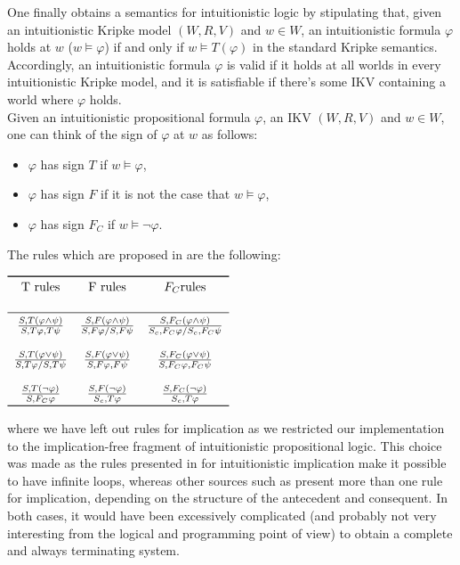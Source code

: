 One finally obtains a semantics for intuitionistic logic by stipulating that, given an intuitionistic Kripke model $(W,R,V)$ and $w \in W$, an intuitionistic formula $\varphi$ holds at $w$ ($w \vDash \varphi$) if and only if $w \vDash T(\varphi)$ in the standard Kripke semantics.
Accordingly, an intuitionistic formula $\varphi$ is valid if it holds at all worlds in every intuitionistic Kripke model, and it is satisfiable if there's some IKV containing a world where $\varphi$ holds. \\
Given an intuitionistic propositional formula $\varphi$, an IKV $(W,R,V)$ and $w \in W$, one can think of the sign of $\varphi$ at $w$ as follows:
\begin{itemize}
    \item $\varphi$ has sign $T$ if $w \vDash \varphi$,
    \item $\varphi$ has sign $F$ if it is not the case that $w \vDash \varphi$,
    \item $\varphi$ has sign $F_C$ if $w \vDash \neg \varphi$.
\end{itemize}

The rules which are proposed in \cite{miglioli1994improved} are the following:

\begin{table}[h]
\Large
\centering
$\begin{array}{ ccc }
\toprule
\text{T rules} & \text{F rules} & F_C \text{rules} \\
& & \\
\midrule
\frac{S, T(\varphi \wedge \psi)}{S,T\varphi,T\psi}& \frac{S, F(\varphi \wedge \psi)}{S,F\varphi/S,F\psi} & \frac{S,F_C(\varphi \wedge \psi)}{S_c,F_C\varphi/S_c,F_C\psi}\\ 
& & \\
\frac{S, T(\varphi \vee \psi)}{S,T\varphi/S,T\psi} & \frac{S, F(\varphi \vee \psi)}{S,F\varphi,F\psi} & \frac{S,F_C(\varphi \vee \psi)}{S,F_C\varphi,F_C\psi}\\
& & \\
\frac{S, T(\neg \varphi)}{S,F_C\varphi} & \frac{S, F(\neg \varphi)}{S_c,T\varphi} & \frac{S, F_C(\neg \varphi)}{S_c,T\varphi}\\
\bottomrule
\end{array}$
\end{table}

where we have left out rules for implication as we restricted our implementation to the implication-free fragment of intuitionistic propositional logic. This choice was made as the rules presented in \cite{miglioli1994improved} for intuitionistic implication make it possible to have infinite loops, whereas other sources such as \cite{ferrari2009tableau} present more than one rule for implication, depending on the structure of the antecedent and consequent. In both cases, it would have been excessively complicated (and probably not very interesting from the logical and programming point of view) to obtain a complete and always terminating system.

